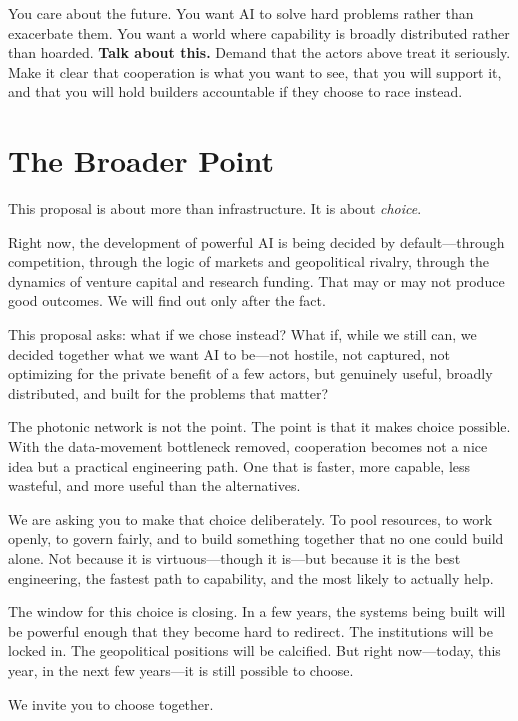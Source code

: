 \documentclass[12pt]{article}
\begin{document}
You care about the future. You want AI to solve hard problems rather than
exacerbate them. You want a world where capability is broadly distributed rather
than hoarded. \textbf{Talk about this.} Demand that the actors above treat it
seriously. Make it clear that cooperation is what you want to see, that you will
support it, and that you will hold builders accountable if they choose to race
instead.

\section{The Broader Point}
\label{sec:broader}

This proposal is about more than infrastructure. It is about \emph{choice}.

Right now, the development of powerful AI is being decided by default---through
competition, through the logic of markets and geopolitical rivalry, through the
dynamics of venture capital and research funding. That may or may not produce
good outcomes. We will find out only after the fact.

This proposal asks: what if we chose instead? What if, while we still can, we
decided together what we want AI to be---not hostile, not captured, not
optimizing for the private benefit of a few actors, but genuinely useful,
broadly distributed, and built for the problems that matter?

The photonic network is not the point. The point is that it makes choice
possible. With the data-movement bottleneck removed, cooperation becomes not a
nice idea but a practical engineering path. One that is faster, more capable,
less wasteful, and more useful than the alternatives.

We are asking you to make that choice deliberately. To pool resources, to work
openly, to govern fairly, and to build something together that no one could
build alone. Not because it is virtuous---though it is---but because it is the
best engineering, the fastest path to capability, and the most likely to
actually help.

The window for this choice is closing. In a few years, the systems being built
will be powerful enough that they become hard to redirect. The institutions will
be locked in. The geopolitical positions will be calcified. But right now---today,
this year, in the next few years---it is still possible to choose.

We invite you to choose together.
\end{document}
